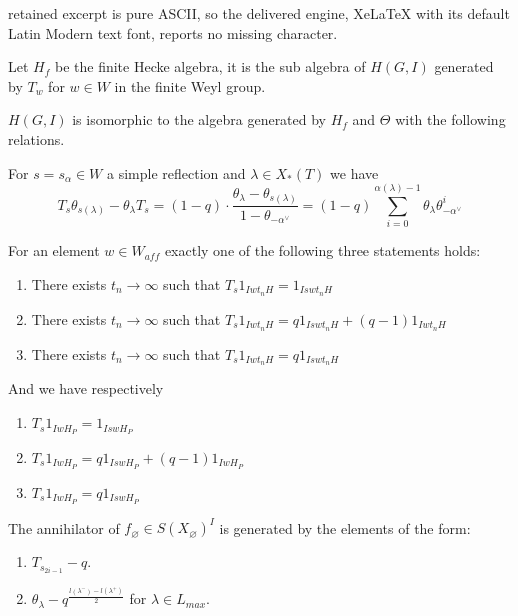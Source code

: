 \documentclass[10pt,a4paper]{amsart}
\renewcommand{\emptyset}{\varnothing}
\begin{document}
retained excerpt is pure ASCII, so the delivered engine, XeLaTeX with its default Latin Modern text font, reports no missing character.
\begin{theorem}\label{Ber_presentation}
    Let $H_f$ be the finite Hecke algebra, it is the sub algebra of $H(G,I)$ generated by $T_w$ for $w\in W$ in the finite Weyl group. 

    $H(G,I)$ is isomorphic to the algebra generated by $H_f$ and $\Theta$ with the following relations.

    For $s=s_\alpha\in W$ a simple reflection and $\lambda\in X_*(T)$ we have $$T_s\theta_{s(\lambda)}-\theta_\lambda T_s=(1-q)\cdot \frac{\theta_\lambda-\theta_{s(\lambda)}}{1-\theta_{-\alpha^\vee}}=(1-q)\sum^{\alpha(\lambda)-1}_{i=0} \theta_\lambda\theta^i_{-\alpha^\vee}$$
\end{theorem}

\begin{prop}\label{action}
For an element $w\in W_{aff}$ exactly one of the following three statements holds:
\begin{enumerate}
    \item There exists $t_n\rightarrow\infty$ such that $T_s1_{Iwt_nH}=1_{Iswt_nH}$
    \item There exists $t_n\rightarrow\infty$ such that $T_s1_{Iwt_nH}=q1_{Iswt_nH}+(q-1)1_{Iwt_nH}$
    \item There exists $t_n\rightarrow\infty$ such that $T_s1_{Iwt_nH}=q1_{Iswt_nH}$
\end{enumerate}
And we have respectively
\begin{enumerate}
    \item $T_s1_{IwH_P}=1_{IswH_P}$
    \item $T_s1_{IwH_P}=q1_{IswH_P}+(q-1)1_{IwH_P}$
    \item $T_s1_{IwH_P}=q1_{IswH_P}$
\end{enumerate}
\end{prop}

    \begin{prop}
    The annihilator of $f_\emptyset\in S(X_\emptyset)^I$ is generated by the elements of the form:
    \begin{enumerate}
        \item $T_{s_{2i-1}}-q$.
        \item $\theta_{\lambda}-q^\frac{l(\lambda^-)-l(\lambda^+)}{2}$ for $\lambda\in L_{max}$.
    \end{enumerate}
    \end{prop}
\end{document}
